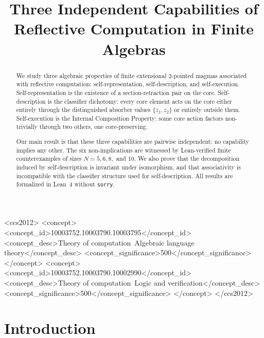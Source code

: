 \documentclass[sigconf,screen,review,anonymous]{acmart}
\begin{document}
\title{Three Independent Capabilities of Reflective Computation in Finite Algebras}

\begin{CCSXML}
<ccs2012>
<concept>
<concept_id>10003752.10003790.10003795</concept_id>
<concept_desc>Theory of computation~Algebraic language theory</concept_desc>
<concept_significance>500</concept_significance>
</concept>
<concept>
<concept_id>10003752.10003790.10002990</concept_id>
<concept_desc>Theory of computation~Logic and verification</concept_desc>
<concept_significance>500</concept_significance>
</concept>
</ccs2012>
\end{CCSXML}



\begin{abstract}
We study three algebraic properties of finite extensional 2-pointed magmas associated with reflective computation: self-representation, self-description, and self-execution. Self-representation is the existence of a section-retraction pair on the core. Self-description is the classifier dichotomy: every core element acts on the core either entirely through the distinguished absorber values $\{z_1,z_2\}$ or entirely outside them. Self-execution is the Internal Composition Property: some core action factors non-trivially through two others, one core-preserving.

Our main result is that these three capabilities are pairwise independent: no capability implies any other. The six non-implications are witnessed by Lean-verified finite counterexamples of sizes $N\!=\!5, 6, 8,$ and $10$. We also prove that the decomposition induced by self-description is invariant under isomorphism, and that associativity is incompatible with the classifier structure used for self-description. All results are formalized in Lean~4 without \texttt{sorry}.
\end{abstract}

\maketitle

\section{Introduction}
\end{document}
